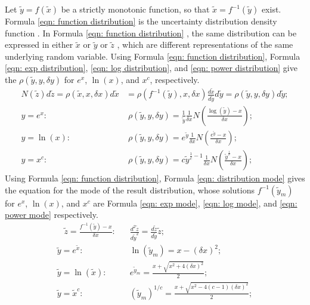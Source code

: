 \documentclass[twoside]{article}
\numberwithin{equation}{section}
\newcommand{\eqspace}{\;\;\;}
\begin{document}
Let $\tilde{y} = f(\tilde{x})$ be a strictly monotonic function, so that $\tilde{x} = f^{-1}(\tilde{y})$ exist.
Formula \eqref{eqn: function distribution} is the uncertainty distribution density function \cite{Statistical_Methods}.
In Formula \eqref{eqn: function distribution} \cite{Statistical_Methods}, the same distribution can be expressed in either $\tilde{x}$ or $\tilde{y}$ or $\tilde{z}$ , which are different representations of the same underlying random variable.
Using Formula \eqref{eqn: function distribution}, Formula \eqref{eqn: exp distribution}, \eqref{eqn: log distribution}, and \eqref{eqn: power distribution} give the $\rho(\tilde{y}, y, \delta y)$ for $e^x$, $\ln(x)$, and $x^c$, respectively.
\begin{align}
\label{eqn: function distribution}
N(\tilde{z}) d \tilde{z} = \rho(\tilde{x}, x, \delta x) d\tilde{x} &= \rho(f^{-1}(\tilde{y}), x, \delta x) \frac{d\tilde{x}}{d\tilde{y}} d\tilde{y} 
= \rho(\tilde{y}, y, \delta y) d\tilde{y}; \\
\label{eqn: exp distribution}
y = e^x: &\; \rho(\tilde{y}, y, \delta y) = \frac{1}{\tilde{y}} \frac{1}{\delta x} N(\frac{\log(\tilde{y}) - x}{\delta x}); \\
\label{eqn: log distribution}
y = \ln(x): &\; \rho(\tilde{y}, y, \delta y) = e^{\tilde{y}} \frac{1}{\delta x} N(\frac{e^{\tilde{y}} - x}{\delta x}); \\
\label{eqn: power distribution}
y = x^c: &\; \rho(\tilde{y}, y, \delta y) = c \tilde{y}^{\frac{1}{c}-1} \frac{1}{\delta x} N(\frac{\tilde{y}^\frac{1}{c} - x}{\delta x}); 
\end{align}
Using Formula \eqref{eqn: function distribution}, Formula \eqref{eqn: distribution mode} gives the equation for the mode of the result distribution, whose solutions $f^{-1}(\tilde{y}_m)$ for $e^x$, $\ln(x)$, and $x^c$ are Formula \eqref{eqn: exp mode}, \eqref{eqn: log mode}, and \eqref{eqn: power mode} respectively.
\begin{align}
\label{eqn: distribution mode}
\eqspace \tilde{z} = \frac{f^{-1}(\tilde{y}) - x}{\delta x}: &\eqspace \frac{d^2 \tilde{z}}{d \tilde{y}^2} = \frac{d \tilde{z}}{d \tilde{y}} \tilde{z}; \\
\label{eqn: exp mode}
\tilde{y} = e^{\tilde{x}}: &\eqspace \ln(\tilde{y}_m) = x - (\delta x)^2; \\
\label{eqn: log mode}
\tilde{y} = \ln(\tilde{x}): &\eqspace e^{\tilde{y}_m} = \frac{x + \sqrt{x^2 + 4 (\delta x)^2}}{2}; \\
\label{eqn: power mode}
\tilde{y} = \tilde{x}^c: &\eqspace (\tilde{y}_m)^{1/c} = \frac{x + \sqrt{x^2 - 4(c-1)(\delta x)^2}}{2};
\end{align}
\end{document}
